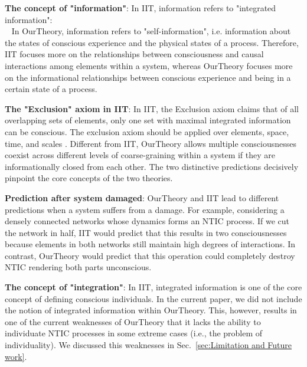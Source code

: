 \documentclass[utf8]{article}
\begin{document}
            \textbf{The concept of "information"}: In IIT, information refers to "integrated information":\\ ~\citep{tononi2016integrated} In \ac{OurTheory}, information refers to "self-information", i.e. information about the states of conscious experience and the physical states of a process. Therefore, IIT focuses more on the relationships between consciousness and causal interactions among elements within a system, whereas \ac{OurTheory} focuses more on the informational relationships between conscious experience and being in a certain state of a process. 
		    
		    \textbf{The "Exclusion" axiom in IIT}: In IIT, the Exclusion axiom claims that of all overlapping sets of elements, only one set with maximal integrated information can be conscious. The exclusion axiom should be applied over elements, space, time, and scales \citep{oizumi2014phenomenology, hoel2016can}. Different from IIT, \ac{OurTheory} allows multiple consciousnesses coexist across different levels of coarse-graining within a system if they are informationally closed from each other. The two distinctive predictions decisively pinpoint the core concepts of the two theories. 
		    
		    \textbf{Prediction after system damaged}: \ac{OurTheory} and IIT lead to different predictions when a system suffers from a damage. For example, considering a densely connected networks whose dynamics forms an NTIC process. If we cut the network in half, IIT would predict that this results in two consciousnesses because elements in both networks still maintain high degrees of interactions. In contrast, \ac{OurTheory} would predict that this operation could completely destroy NTIC rendering both parts unconscious.
		    
		    \textbf{The concept of "integration"}: In IIT, integrated information is one of the core concept of defining conscious individuals. In the current paper, we did not include the notion of integrated information within \ac{OurTheory}. This, however, results in one of the current weaknesses of \ac{OurTheory} that it lacks the ability to individuate NTIC processes in some extreme cases (i.e., the problem of individuality). We discussed this weaknesses in Sec.~\ref{sec:Limitation and Future work}.
		    

\end{document}

